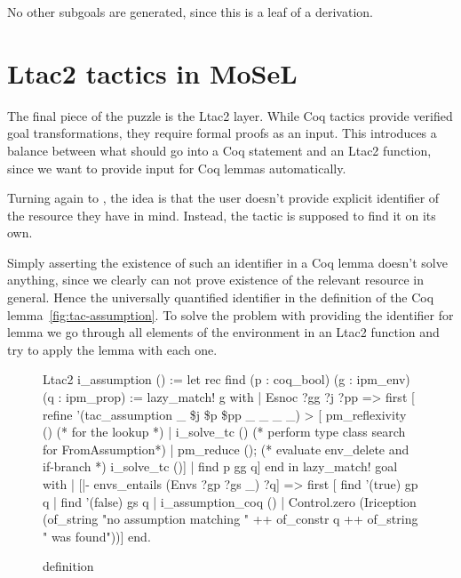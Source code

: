 No other subgoals are generated, since this is a leaf of a derivation.

\section{Ltac2 tactics in MoSeL}
\label{sec:ltac2-tactics-mosel}

The final piece of the puzzle is the Ltac2 layer.
While Coq tactics provide verified goal transformations, they require formal proofs as an input.
This introduces a balance between what should go into a Coq statement and an Ltac2 function, since we want to provide input for Coq lemmas automatically.

Turning again to , the idea is that the user doesn't provide explicit identifier of the resource they have in mind.
Instead, the tactic is supposed to find it on its own.

Simply asserting the existence of such an identifier in a Coq lemma doesn't solve anything, since we clearly can not prove existence of the relevant resource in general.
Hence the universally quantified identifier in the definition of the Coq lemma~\ref{fig:tac-assumption}.
To solve the problem with providing the identifier for lemma we go through all elements of the environment in an Ltac2 function and try to apply the lemma with each one.

\begin{figure}
\begin{coq}
Ltac2 i_assumption () :=
  let rec find (p : coq_bool) (g : ipm_env) (q : ipm_prop) :=
      lazy_match! g with
      | Esnoc ?gg ?j ?pp =>
        first [ refine '(tac_assumption _ \$j \$p \$pp _ _ _ _) >
                [ pm_reflexivity () (* for the lookup *)
                | i_solve_tc () (* perform type class search for FromAssumption*)
                | pm_reduce (); (* evaluate env_delete and if-branch *)
                  i_solve_tc ()]
              | find p gg q]
      end
  in
  lazy_match! goal with
  | [|- envs_entails (Envs ?gp ?gs _) ?q] =>
     first [ find '(true) gp q
           | find '(false) gs q
           | i_assumption_coq ()
           | Control.zero (Iriception (of_string "no assumption matching " ++
                                       of_constr q ++
                                       of_string " was found"))]
  end.
\end{coq}
\caption{ definition}
\label{fig:i-assumption-def}
\end{figure}

